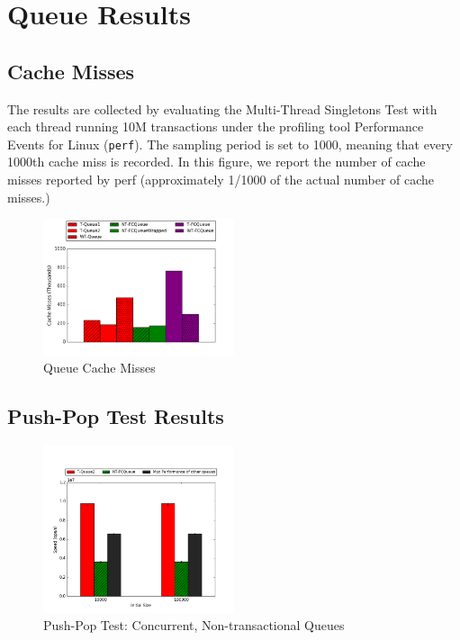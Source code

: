 \chapter{Queue Results}
\label{app:queue}

\section{Cache Misses}

The results are collected by evaluating the Multi-Thread Singletons Test with each thread running 10M transactions under the profiling tool Performance Events for Linux (\texttt{perf}). The sampling period is set to 1000, meaning that every 1000th cache miss is recorded. In this figure, we report the number of cache misses reported by perf (approximately 1/1000 of the actual number of cache misses.)

\begin{figure}[H]
    \centering
    \includegraphics[width=0.5\textwidth]{fcqueues/cm.png}
    \caption{Queue Cache Misses}
\label{fig:cm_queues}
\end{figure}

\section{Push-Pop Test Results}
\label{app:queue_pp}

\begin{figure}[H]
    \centering
    \includegraphics[width=0.5\textwidth]{concurrent/Q:PushPop.png}
    \caption{Push-Pop Test: Concurrent, Non-transactional Queues}
    \label{fig:concurrentqs_pushpop}
\end{figure}

